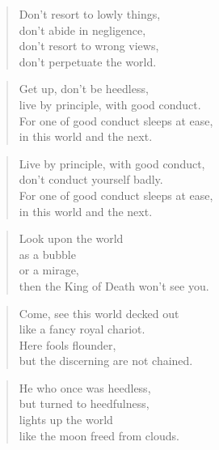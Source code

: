 \documentclass[12pt,openany]{book}%
\begin{document}
\begin{verse}%
Don’t resort to lowly things, \\
don’t abide in negligence, \\
don’t resort to wrong views, \\
don’t perpetuate the world. 

%
\end{verse}

\begin{verse}%
Get up, don’t be heedless, \\
live by principle, with good conduct. \\
For one of good conduct sleeps at ease, \\
in this world and the next. 

%
\end{verse}

\begin{verse}%
Live by principle, with good conduct, \\
don’t conduct yourself badly. \\
For one of good conduct sleeps at ease, \\
in this world and the next. 

%
\end{verse}

\begin{verse}%
Look upon the world \\
as a bubble \\
or a mirage, \\
then the King of Death won’t see you. 

%
\end{verse}

\begin{verse}%
Come, see this world decked out \\
like a fancy royal chariot. \\
Here fools flounder, \\
but the discerning are not chained. 

%
\end{verse}

\begin{verse}%
He who once was heedless, \\
but turned to heedfulness, \\
lights up the world \\
like the moon freed from clouds. 

%
\end{verse}
\end{document}
